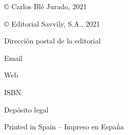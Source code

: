 \documentclass[10pt]{book}
\begin{document}
\begin{titlepage}\thispagestyle{empty}
  \vspace*{\fill}
  {\normalsize\centering © Carlos Blé Jurado, 2021 \par}
  \vspace*{0.15cm}
  {\normalsize\centering © Editorial Savvily, S.A., 2021 \par}
  \vspace*{0.15cm}
  {\normalsize\centering Dirección postal de la editorial \par}
  \vspace*{0.15cm}
  {\normalsize\centering Email \par}
  \vspace*{0.15cm}
  {\normalsize\centering Web \par}
  \vspace*{0.75cm}
  {\normalsize\centering ISBN \par}
  {\normalsize\centering Depósito legal \par}
  \vspace*{0.75cm}
  {\normalsize\centering Printed in Spain – Impreso en España\par}
\end{titlepage}
\end{document}
